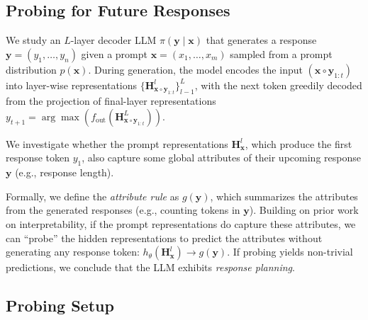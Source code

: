     \subsection{Probing for Future Responses}\label{subsec:probing-for-future-responses}
    We study an $L$-layer decoder LLM $\pi(\mathbf{y} \mid \mathbf{x})$ that generates a response $\mathbf{y} = (y_1, \dots, y_n)$ given a prompt $\mathbf{x} = (x_1, \dots, x_m)$ sampled from a prompt distribution $p(\mathbf{x})$. During generation, the model encodes the input $(\mathbf{x} \circ \mathbf{y}_{1:t})$ into layer-wise representations $\{ \mathbf{H}^l_{\mathbf{x} \circ \mathbf{y}_{1:t}} \}^L_{l-1}$, with the next token greedily decoded from the projection of final-layer representations $y_{t+1} = \arg \max(f_{\text{out}}(\mathbf{H}^L_{\mathbf{x} \circ \mathbf{y}_{1:t}}))$.
    
    We investigate whether the prompt representations $\mathbf{H}^l_{\mathbf{x}}$, which produce the first response token $y_1$, also capture some global attributes of their upcoming response $\mathbf{y}$ (e.g., response length).
    
    Formally, we define the \textit{attribute rule} as $g(\mathbf{y})$, which summarizes the attributes from the generated responses (e.g., counting tokens in $\mathbf{y}$). Building on prior work on interpretability, if the prompt representations do capture these attributes, we can ``probe'' the hidden representations to predict the attributes without generating any response token: $h_\theta(\mathbf{H}^l_{\mathbf{x}}) \rightarrow g(\mathbf{y})$. If probing yields non-trivial predictions, we conclude that the LLM exhibits \textit{response planning}.
    
    \subsection{Probing Setup}\label{subsec:probing-setup}
    
    
